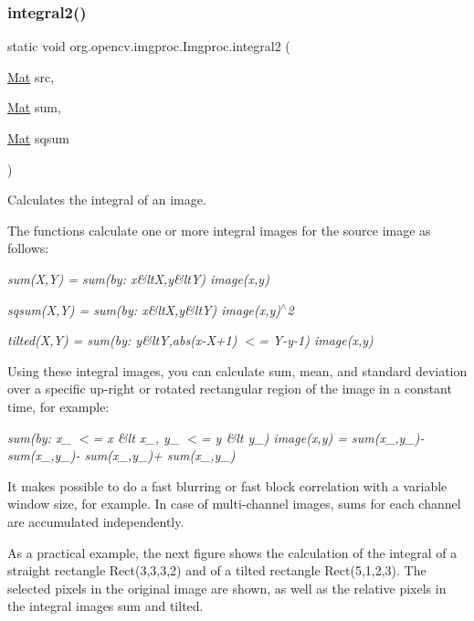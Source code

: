 \subsubsection{\texorpdfstring{integral2()}{integral2()}\hspace{0.1cm}{\footnotesize\ttfamily [2/2]}}
{\footnotesize\ttfamily static void org.\+opencv.\+imgproc.\+Imgproc.\+integral2 (\begin{DoxyParamCaption}\item[{\mbox{\hyperlink{classorg_1_1opencv_1_1core_1_1_mat}{Mat}}}]{src,  }\item[{\mbox{\hyperlink{classorg_1_1opencv_1_1core_1_1_mat}{Mat}}}]{sum,  }\item[{\mbox{\hyperlink{classorg_1_1opencv_1_1core_1_1_mat}{Mat}}}]{sqsum }\end{DoxyParamCaption})\hspace{0.3cm}{\ttfamily [static]}}

Calculates the integral of an image.

The functions calculate one or more integral images for the source image as follows\+:

{\itshape sum(\+X,\+Y) = sum(by\+: x\&lt\+X,y\&lt\+Y) image(x,y)}

{\itshape sqsum(\+X,\+Y) = sum(by\+: x\&lt\+X,y\&lt\+Y) image(x,y)$^\wedge$2}

{\itshape tilted(\+X,\+Y) = sum(by\+: y\&ltY,abs(x-\/\+X+1) $<$= Y-\/y-\/1) image(x,y)}

Using these integral images, you can calculate sum, mean, and standard deviation over a specific up-\/right or rotated rectangular region of the image in a constant time, for example\+:

{\itshape sum(by\+: x\+\_ $<$= x \&lt x\+\_, y\+\_ $<$= y \&lt y\+\_) image(x,y) = sum(x\+\_,y\+\_)-\/ sum(x\+\_,y\+\_)-\/ sum(x\+\_,y\+\_)+ sum(x\+\_,y\+\_)}

It makes possible to do a fast blurring or fast block correlation with a variable window size, for example. In case of multi-\/channel images, sums for each channel are accumulated independently.

As a practical example, the next figure shows the calculation of the integral of a straight rectangle {\ttfamily Rect(3,3,3,2)} and of a tilted rectangle {\ttfamily Rect(5,1,2,3)}. The selected pixels in the original {\ttfamily image} are shown, as well as the relative pixels in the integral images {\ttfamily sum} and {\ttfamily tilted}.


